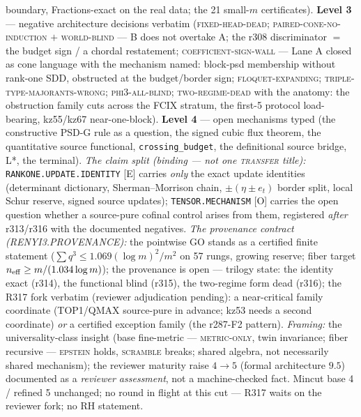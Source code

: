 {boundary, Fractions-exact on the real data; the 21 small-$m$
certificates).  \textbf{Level 3} --- negative architecture
decisions verbatim (\textsc{fixed-head-dead};
\textsc{paired-cone-no-induction} $+$ \textsc{world-blind} --- B
does not overtake A; the r308 discriminator $=$ the budget sign /
a chordal restatement; \textsc{coefficient-sign-wall} --- Lane A
closed as cone language with the mechanism named: block-psd
membership without rank-one SDD, obstructed at the budget/border
sign; \textsc{floquet-expanding};
\textsc{triple-type-majorants-wrong}; \textsc{phi3-all-blind};
\textsc{two-regime-dead} with the anatomy: the obstruction family
cuts across the FCIX stratum, the first-5 protocol load-bearing,
kz55/kz67 near-one-block).  \textbf{Level 4} --- open mechanisms
typed (the constructive PSD-G rule as a question, the signed cubic
flux theorem, the quantitative source functional,
\texttt{crossing\_budget}, the definitional source bridge, L*, the
terminal).  \emph{The claim split (binding --- not one
\textsc{transfer} title):} \texttt{RANKONE.UPDATE.IDENTITY} [E]
carries \emph{only} the exact update identities (determinant
dictionary, Sherman--Morrison chain, $\pm(\eta\pm e_t)$ border
split, local Schur reserve, signed source updates);
\texttt{TENSOR.MECHANISM} [O] carries the open question whether a
source-pure cofinal control arises from them, registered
\emph{after} r313/r316 with the documented negatives.  \emph{The
provenance contract (RENYI3.PROVENANCE):} the pointwise GO stands
as a certified finite statement ($\sum q^3 \le
1.069(\log m)^2/m^2$ on 57 rungs, growing reserve; fiber target
$n_{\rm eff} \ge m/(1.034\log m)$); the provenance is open ---
trilogy state: the identity exact (r314), the functional blind
(r315), the two-regime form dead (r316); the R317 fork verbatim
(reviewer adjudication pending): a near-critical family coordinate
(TOP1/QMAX source-pure in advance; kz53 needs a second coordinate)
\emph{or} a certified exception family (the r287-F2 pattern).
\emph{Framing:} the universality-class insight (base fine-metric
--- \textsc{metric-only}, twin invariance; fiber recursive ---
\textsc{epstein} holds, \textsc{scramble} breaks; shared algebra,
not necessarily shared mechanism); the reviewer maturity raise
$4 \to 5$ (formal architecture $9.5$) documented as a
\emph{reviewer assessment}, not a machine-checked fact.  Mincut
base 4 / refined 5 unchanged; no round in flight at this cut ---
R317 waits on the reviewer fork; no RH statement.\par}


